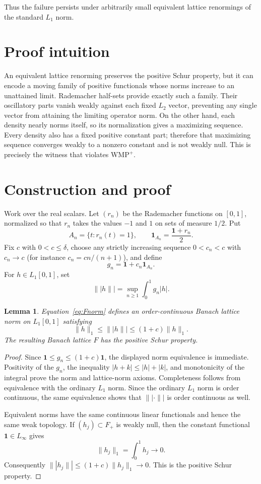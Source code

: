 \documentclass[11pt]{article}
\newtheorem{lemma}{Lemma}
\newcommand{\one}{\mathbf 1}
\newcommand{\WMP}{\mathrm{WMP}^{+}}
\begin{document}
Thus the failure persists under arbitrarily small equivalent lattice
renormings of the standard $L_1$ norm.

\section{Proof intuition}

An equivalent lattice renorming preserves the positive Schur property, but it
can encode a moving family of positive functionals whose norms increase to an
unattained limit. Rademacher half-sets provide exactly such a family. Their
oscillatory parts vanish weakly against each fixed $L_2$ vector, preventing
any single vector from attaining the limiting operator norm. On the other
hand, each density nearly norms itself, so its normalization gives a
maximizing sequence. Every density also has a fixed positive constant part;
therefore that maximizing sequence converges weakly to a nonzero constant and
is not weakly null. This is precisely the witness that violates $\WMP$.

\section{Construction and proof}

Work over the real scalars. Let $(r_n)$ be the Rademacher functions on
$[0,1]$, normalized so that $r_n$ takes the values $-1$ and $1$ on sets of
measure $1/2$. Put
\[
 A_n=\{t:r_n(t)=1\},\qquad \one_{A_n}=\frac{\one+r_n}{2}.
\]
Fix $c$ with $0<c\leq\delta$, choose any strictly increasing sequence
$0<c_n<c$ with $c_n\to c$ (for instance $c_n=cn/(n+1)$), and define
\[
 g_n=\one+c_n\one_{A_n}.
\]
For $h\in L_1[0,1]$, set
\begin{equation}\label{eq:Fnorm}
 \|\!|h\|\!|=\sup_{n\geq1}\int_0^1 g_n|h|.
\end{equation}

\begin{lemma}\label{lem:lattice}
Equation~\eqref{eq:Fnorm} defines an order-continuous Banach lattice norm on
$L_1[0,1]$ satisfying
\[
 \|h\|_1\leq\|\!|h\|\!|\leq(1+c)\|h\|_1.
\]
The resulting Banach lattice $F$ has the positive Schur property.
\end{lemma}

\begin{proof}
Since $\one\leq g_n\leq(1+c)\one$, the displayed norm equivalence is
immediate. Positivity of the $g_n$, the inequality
$|h+k|\leq|h|+|k|$, and monotonicity of the integral prove the norm and
lattice-norm axioms. Completeness follows from equivalence with the ordinary
$L_1$ norm. Since the ordinary $L_1$ norm is order continuous, the same
equivalence shows that $\|\!|\cdot\|\!|$ is order continuous as well.

Equivalent norms have the same continuous linear functionals and hence the
same weak topology. If $(h_j)\subset F_+$ is weakly null, then the constant
functional $\one\in L_\infty$ gives
\[
 \|h_j\|_1=\int_0^1h_j\longrightarrow0.
\]
Consequently
$\|\!|h_j\|\!|\leq(1+c)\|h_j\|_1\to0$. This is the positive Schur
property.
\end{proof}
\end{document}

